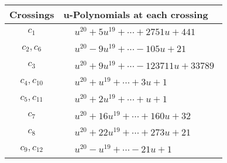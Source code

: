 \documentclass[1p]{elsarticle_modified}
\theoremstyle{definition}
\begin{document}
\begin{tabular}{m{50pt}|m{274pt}}
Crossings & \hspace{64pt}u-Polynomials at each crossing \\
\hline $$\begin{aligned}c_{1}\end{aligned}$$&$\begin{aligned}
&u^{20}+5 u^{19}+\cdots+2751 u+441
\end{aligned}$\\
\hline $$\begin{aligned}c_{2},c_{6}\end{aligned}$$&$\begin{aligned}
&u^{20}-9 u^{19}+\cdots-105 u+21
\end{aligned}$\\
\hline $$\begin{aligned}c_{3}\end{aligned}$$&$\begin{aligned}
&u^{20}+9 u^{19}+\cdots-123711 u+33789
\end{aligned}$\\
\hline $$\begin{aligned}c_{4},c_{10}\end{aligned}$$&$\begin{aligned}
&u^{20}+u^{19}+\cdots+3 u+1
\end{aligned}$\\
\hline $$\begin{aligned}c_{5},c_{11}\end{aligned}$$&$\begin{aligned}
&u^{20}+2 u^{19}+\cdots+u+1
\end{aligned}$\\
\hline $$\begin{aligned}c_{7}\end{aligned}$$&$\begin{aligned}
&u^{20}+16 u^{19}+\cdots+160 u+32
\end{aligned}$\\
\hline $$\begin{aligned}c_{8}\end{aligned}$$&$\begin{aligned}
&u^{20}+22 u^{19}+\cdots+273 u+21
\end{aligned}$\\
\hline $$\begin{aligned}c_{9},c_{12}\end{aligned}$$&$\begin{aligned}
&u^{20}- u^{19}+\cdots-21 u+1
\end{aligned}$\\
\hline
\end{tabular}\\~\\
\end{document}
